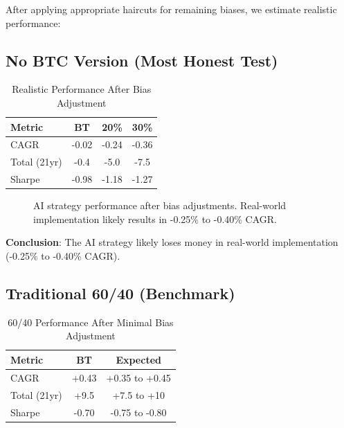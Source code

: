 \documentclass[twocolumn,ieee]{arithmaxresearch}
\begin{document}
After applying appropriate haircuts for remaining biases, we estimate realistic performance:

\subsection{No BTC Version (Most Honest Test)}

\begin{table}[h]
\centering
\caption{Realistic Performance After Bias Adjustment}
\begin{tabular}{lccc}
\toprule
\textbf{Metric} & \textbf{BT} & \textbf{20\%} & \textbf{30\%} \\
\midrule
CAGR & -0.02 & -0.24 & -0.36 \\
Total (21yr) & -0.4 & -5.0 & -7.5 \\
Sharpe & -0.98 & -1.18 & -1.27 \\
\bottomrule
\end{tabular}
\end{table}

\begin{figure}[h]
\centering
{}
\caption{AI strategy performance after bias adjustments. Real-world implementation likely results in -0.25\% to -0.40\% CAGR.}
\label{fig:haircut}
\end{figure}

\textbf{Conclusion}: The AI strategy likely loses money in real-world implementation (-0.25\% to -0.40\% CAGR).

\subsection{Traditional 60/40 (Benchmark)}

\begin{table}[h]
\centering
\caption{60/40 Performance After Minimal Bias Adjustment}
\begin{tabular}{lcc}
\toprule
\textbf{Metric} & \textbf{BT} & \textbf{Expected} \\
\midrule
CAGR & +0.43 & +0.35 to +0.45 \\
Total (21yr) & +9.5 & +7.5 to +10 \\
Sharpe & -0.70 & -0.75 to -0.80 \\
\bottomrule
\end{tabular}
\end{table}
\end{document}
